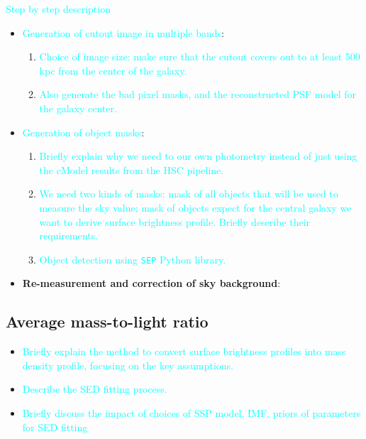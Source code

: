 \documentclass[preprint]{aastex}
\newcommand{\plan}[1]{\textcolor{cyan}{#1}}
\begin{document}
\begin{CJK*}{UTF8}{gbsn}
    \plan{Step by step description}
    \begin{itemize}
        \item \plan{Generation of cutout image in multiple bands}: \\
            \begin{enumerate}
                \item \plan{Choice of image size: make sure that the cutout covers out 
                    to at least 500 kpc from the center of the galaxy.}
                \item \plan{Also generate the bad pixel masks, and the reconstructed 
                    PSF model for the galaxy center.}
            \end{enumerate}
        \item \plan{Generation of object masks}: \\
            \begin{enumerate}
                \item \plan{Briefly explain why we need to our own photometry instead 
                    of just using the cModel results from the HSC pipeline.}
                \item \plan{We need two kinds of masks: mask of all objects that will 
                    be used to measure the sky value; mask of objects expect for the 
                    central galaxy we want to derive surface brightness profile.  
                    Briefly describe their requirements.}
                \item \plan{Object detection using \texttt{SEP} Python library.}
            \end{enumerate}
        \item \textbf{Re-measurement and correction of sky background}:
    \end{itemize}
    
\subsection{Average mass-to-light ratio}

    \begin{itemize}
        \item \plan{Briefly explain the method to convert surface brightness profiles 
            into mass density profile, focusing on the key assumptions.}
        \item \plan{Describe the SED fitting process.}    
        \item \plan{Briefly discuss the impact of choices of SSP model, IMF, priors of 
            parameters for SED fitting}
    \end{itemize}


\end{CJK*}
\end{document}
